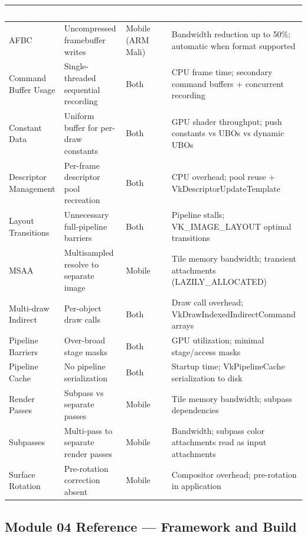 \documentclass[11pt,letterpaper]{article}
\newcommand{\tableheader}[1]{\textbf{\sffamily\textcolor{white}{#1}}}
\begin{document}
\begin{center}
\begin{tabularx}{\textwidth}{L{3cm}L{3cm}L{2cm}X}
\toprule
{}
\tableheader{Sample} & \tableheader{Antipattern} & \tableheader{Platform} & \tableheader{Metric / Feature Required} \\
\midrule
AFBC & Uncompressed framebuffer writes & Mobile (ARM Mali) & Bandwidth reduction up to 50\%; automatic when format supported \\
Command Buffer Usage & Single-threaded sequential recording & Both & CPU frame time; secondary command buffers + concurrent recording \\
Constant Data & Uniform buffer for per-draw constants & Both & GPU shader throughput; push constants vs UBOs vs dynamic UBOs \\
Descriptor Management & Per-frame descriptor pool recreation & Both & CPU overhead; pool reuse + VkDescriptorUpdateTemplate \\
Layout Transitions & Unnecessary full-pipeline barriers & Both & Pipeline stalls; VK\_IMAGE\_LAYOUT optimal transitions \\
MSAA & Multisampled resolve to separate image & Mobile & Tile memory bandwidth; transient attachments (LAZILY\_ALLOCATED) \\
Multi-draw Indirect & Per-object draw calls & Both & Draw call overhead; VkDrawIndexedIndirectCommand arrays \\
Pipeline Barriers & Over-broad stage masks & Both & GPU utilization; minimal stage/access masks \\
Pipeline Cache & No pipeline serialization & Both & Startup time; VkPipelineCache serialization to disk \\
Render Passes & Subpass vs separate passes & Mobile & Tile memory bandwidth; subpass dependencies \\
Subpasses & Multi-pass to separate render passes & Mobile & Bandwidth; subpass color attachments read as input attachments \\
Surface Rotation & Pre-rotation correction absent & Mobile & Compositor overhead; pre-rotation in application \\
\bottomrule
\end{tabularx}
\end{center}

\subsection{Module 04 Reference --- Framework and Build}
\end{document}
